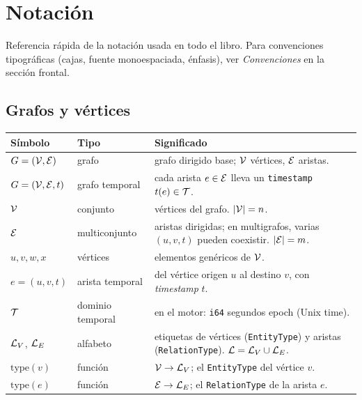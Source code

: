 \chapter{Notación}
\label{ap:notacion}

Referencia rápida de la notación usada en todo el libro. Para
convenciones tipográficas (cajas, fuente monoespaciada, énfasis), ver
\emph{Convenciones} en la sección frontal.

\section{Grafos y vértices}

\begin{center}
\renewcommand{\arraystretch}{1.3}
\begin{longtable}{p{3.0cm}p{2.0cm}p{8.5cm}}
\toprule
\textbf{Símbolo} & \textbf{Tipo} & \textbf{Significado} \\
\midrule
\(G = (\mathcal{V}, \mathcal{E})\)              & grafo            & grafo dirigido base; \(\mathcal{V}\) vértices, \(\mathcal{E}\) aristas. \\
\(G = (\mathcal{V}, \mathcal{E}, t)\)           & grafo temporal   & cada arista \(e \in \mathcal{E}\) lleva un \texttt{timestamp} \(t(e) \in \mathcal{T}\). \\
\(\mathcal{V}\)                        & conjunto         & vértices del grafo. \(|\mathcal{V}| = n\). \\
\(\mathcal{E}\)                        & multiconjunto    & aristas dirigidas; en multigrafos, varias \((u, v, t)\) pueden coexistir. \(|\mathcal{E}| = m\). \\
\(u, v, w, x\)                & vértices         & elementos genéricos de \(\mathcal{V}\). \\
\(e = (u, v, t)\)             & arista temporal  & del vértice origen \(u\) al destino \(v\), con \emph{timestamp} \(t\). \\
\(\mathcal{T}\)                        & dominio temporal & en el motor: \texttt{i64} segundos epoch (Unix time). \\
\(\mathcal{L}_V\), \(\mathcal{L}_E\)          & alfabeto         & etiquetas de vértices (\texttt{EntityType}) y aristas (\texttt{RelationType}). \(\mathcal{L} = \mathcal{L}_V \cup \mathcal{L}_E\). \\
\(\mathrm{type}(v)\)          & función          & \(\mathcal{V} \to \mathcal{L}_V\); el \texttt{EntityType} del vértice \(v\). \\
\(\mathrm{type}(e)\)          & función          & \(\mathcal{E} \to \mathcal{L}_E\); el \texttt{RelationType} de la arista \(e\). \\
\bottomrule
\end{longtable}
\end{center}

